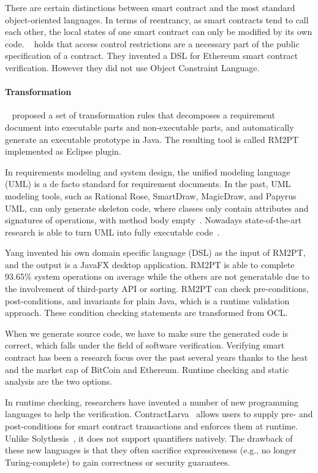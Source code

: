 There are certain distinctions between smart contract and the most standard object-oriented languages. In terms of reentrancy, as smart contracts tend to call each other, the local states of one smart contract can only be modified by its own code.
~\cite{bram2021rich} holds that access control restrictions are a necessary part of the public specification of a contract. They invented a DSL for Ethereum smart contract verification. However they did not use Object Constraint Language.


\paragraph*{Transformation}
~\cite{yang2019automated} proposed a set of transformation rules that decomposes a requirement document into executable parts and non-executable parts, and automatically generate an executable prototype in Java.
The resulting tool is called RM2PT implemented as Eclipse plugin.

In requirements modeling and system design, the unified modeling language (UML) is a de facto standard for requirement documents.
In the past, UML modeling tools, such as Rational Rose, SmartDraw, MagicDraw, and Papyrus UML, can only generate skeleton code, where classes only contain attributes and signatures of operations, with method body empty~\cite{regep2000using}. Nowadays state-of-the-art research is able to turn UML into fully executable code~\cite{ciccozzi2019execution}.

Yang invented his own domain specific language (DSL) as the input of RM2PT, and the output is a JavaFX desktop application. RM2PT is able to complete 93.65\% system operations on average while the others are not generatable due to the involvement of third-party API or sorting.
RM2PT can check pre-conditions, post-conditions, and invariants for plain Java, which is a runtime validation approach.
These condition checking statements are transformed from OCL.

When we generate source code, we have to make sure the generated code is correct, which falls under the field of software verification.
Verifying smart contract has been a research focus over the past several years thanks to the heat and the market cap of BitCoin and Ethereum.
Runtime checking and static analysis are the two options.


In runtime checking, researchers have invented a number of new programming languages to help the verification.
ContractLarva~\cite{ellul2018runtime} allows users to supply pre- and post-conditions for smart contract transactions and enforces them at runtime. Unlike Solythesis~\cite{li2020securing}, it does not support quantifiers natively.
The drawback of these new languages is that they often sacrifice expressiveness (e.g., no longer Turing-complete) to gain correctness or security guarantees.

